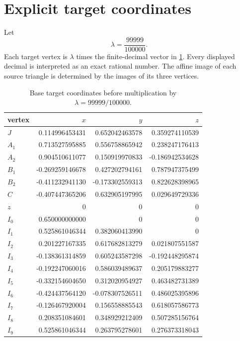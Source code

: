 \section{Explicit target coordinates}\label{sec:coordinates}
Let
\[
\lambda=\frac{99999}{100000}.
\]
Each target vertex is $\lambda$ times the finite-decimal vector in \cref{tab:coords}.  Every displayed decimal is interpreted as an exact rational number.  The affine image of each source triangle is determined by the images of its three vertices.

\begin{table}[H]
\centering
\small
\caption{Base target coordinates before multiplication by $\lambda=99999/100000$.}
\label{tab:coords}
\begin{tabular}{@{}lrrr@{}}
\toprule
vertex & $x$ & $y$ & $z$\\
\midrule
$J$ & 0.114996453431 & 0.652042463578 & 0.359274110539\\
$A_1$ & 0.713527595885 & 0.556758865942 & 0.238247176413\\
$A_2$ & 0.904510611077 & 0.150919970833 & -0.186942534628\\
$B_1$ & -0.269259146678 & 0.427202794161 & 0.787947375499\\
$B_2$ & -0.411232941130 & -0.173302559313 & 0.822628398965\\
$C$ & -0.407447365206 & 0.632905197995 & 0.029649729336\\
$z$ & 0 & 0 & 0\\
$I_0$ & 0.650000000000 & 0 & 0\\
$I_1$ & 0.525861046344 & 0.382060413990 & 0\\
$I_2$ & 0.201227167335 & 0.617682813279 & 0.021807551587\\
$I_3$ & -0.138361314859 & 0.605243587298 & -0.192448295874\\
$I_4$ & -0.192247060016 & 0.586039489637 & 0.205179883277\\
$I_5$ & -0.332154604650 & 0.312020954927 & 0.463482731389\\
$I_6$ & -0.424437564120 & -0.078307526511 & 0.486025395896\\
$I_7$ & -0.126467920004 & 0.156558885543 & 0.618057586773\\
$I_8$ & 0.208351084601 & 0.348929212409 & 0.507285156764\\
$I_9$ & 0.525861046344 & 0.263795278601 & 0.276373318043\\
\bottomrule
\end{tabular}
\end{table}

